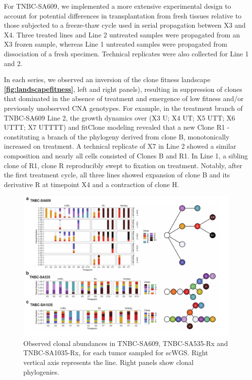 For TNBC-SA609, we implemented a more extensive experimental design to account for potential differences in transplantation from fresh tissues relative to those subjected to a freeze-thaw cycle used in serial propagation between X3 and X4. Three treated lines and Line 2 untreated samples were propagated from an X3 frozen sample, whereas Line 1 untreated samples were propagated from dissociation of a fresh specimen. Technical replicates were also collected for Line 1 and 2.    

In each series, we observed an inversion of the clone fitness landscape \textbf{\autoref{fig:landscapefitness}}, left and right panels), resulting in suppression of clones that dominated in the absence of treatment and emergence of low fitness and/or previously unobserved CNA genotypes. For example, in the treatment branch of TNBC-SA609 Line 2, the growth dynamics over (X3 U; X4 UT; X5 UTT; X6 UTTT; X7 UTTTT) and fitClone modeling revealed that a new Clone R1 - constituting a branch of the phylogeny derived from clone B,  monotonically increased on treatment. A technical replicate of X7 in Line 2 showed a similar composition and nearly all cells consisted of Clones B and R1.  In Line 1, a sibling clone of R1, clone R reproducibly swept to fixation on treatment. Notably, after the first treatment cycle, all three lines showed expansion of clone B and its derivative R at timepoint X4 and a contraction of clone H. 

\begin{figure}
\centering
\includegraphics[width=\textwidth]{Figures/All3barplots.pdf}
\caption[Summary of number of genes \textit{in-cis} and \textit{in-trans}]
	{\small
	\textbf{}
	Observed clonal abundances in TNBC-SA609, TNBC-SA535-Rx and TNBC-SA1035-Rx, for each tumor sampled for scWGS. Right vertical axis represents the line. Right panels show clonal phylogenies.
}
    \label{fig:All3barplots}
    \end{figure}

